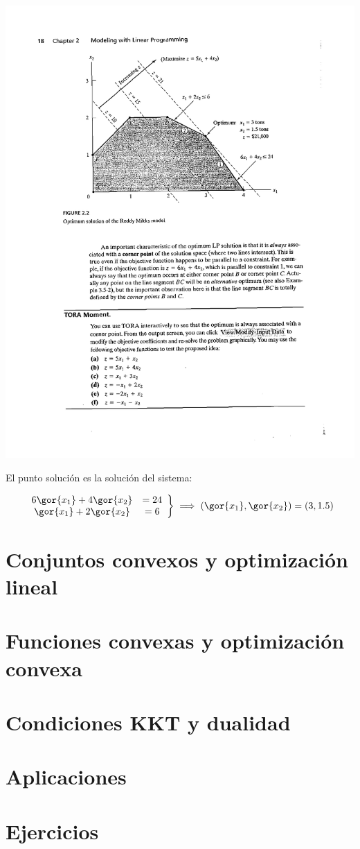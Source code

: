 \documentclass[palatino]{apuntes}
\begin{document}
\begin{example}
\begin{center}
\label{prob:intro}
\includegraphics[scale=0.8]{tex/berrendero/tema1/_GraficoEjemplo2}
\end{center}


El punto solución es la solución del sistema:

\[
\left.\begin{array}{cc} 6\gor{x_1} + 4\gor{x_2} &= 24\\ \gor{x_1} + 2\gor{x_2} &= 6\end{array}\right\} \implies (\gor{x_1},\gor{x_2}) = (3,1.5)
\]
\end{example}


\chapter{Conjuntos convexos y optimización lineal}



\chapter{Funciones convexas y optimización convexa}


\chapter{Condiciones KKT y dualidad}


\chapter{Aplicaciones}



\appendix
\chapter{Ejercicios}

\printindex
\end{document}
